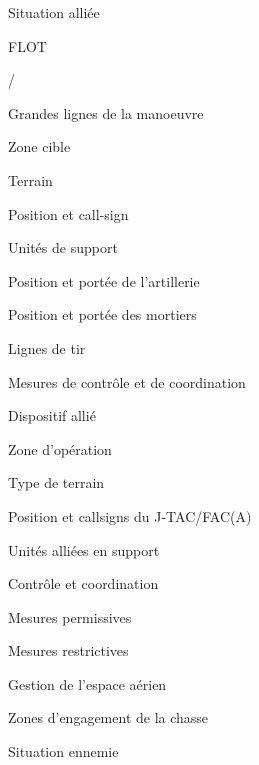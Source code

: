 \begin{e1}
    \item Situation alliée
    \begin{e2}
        \item FLOT
        \item {} / 
        \item Grandes lignes de la manoeuvre
        \begin{e3}
            \item Zone cible
            \item Terrain
            \item Position et call-sign \ja{}
            \item Unités de support
            \begin{e4}
            	\item Position et portée de l'artillerie
            	\item Position et portée des mortiers
            	\item Lignes de tir 
            \end{e4}
            \item Mesures de contrôle et de coordination
            \begin{e4}
				\item {}            %
            \end{e4}
        \end{e3}
        \item Dispositif allié
        \begin{e3}
            \item Zone d’opération
            \item Type de terrain
            \item Position et callsigns du J-TAC/FAC(A)
            \item Unités alliées en support
        \end{e3}
        \item Contrôle et coordination
        \begin{e3}
            \item Mesures permissives
            \item Mesures restrictives
        \end{e3}
        \item Gestion de l’espace aérien
        \item Zones d’engagement de la chasse
    \end{e2}
    \item Situation ennemie

\end{e1}
